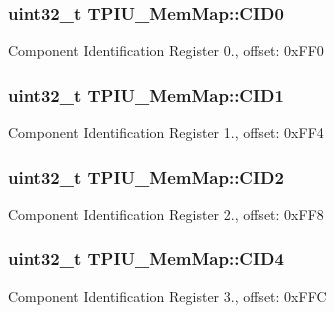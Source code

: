 \subsubsection[{C\+I\+D0}]{\setlength{\rightskip}{0pt plus 5cm}uint32\+\_\+t T\+P\+I\+U\+\_\+\+Mem\+Map\+::\+C\+I\+D0}\label{struct_t_p_i_u___mem_map_a396bb8a0f5c7a9494f0cd0973e8a141d}
Component Identification Register 0., offset\+: 0x\+F\+F0 \hypertarget{struct_t_p_i_u___mem_map_afa92c6c4b400339e646d717e30b505b7}{}
\subsubsection[{C\+I\+D1}]{\setlength{\rightskip}{0pt plus 5cm}uint32\+\_\+t T\+P\+I\+U\+\_\+\+Mem\+Map\+::\+C\+I\+D1}\label{struct_t_p_i_u___mem_map_afa92c6c4b400339e646d717e30b505b7}
Component Identification Register 1., offset\+: 0x\+F\+F4 \hypertarget{struct_t_p_i_u___mem_map_a3b613f265bf4b8c679e4da5f002eb4cd}{}
\subsubsection[{C\+I\+D2}]{\setlength{\rightskip}{0pt plus 5cm}uint32\+\_\+t T\+P\+I\+U\+\_\+\+Mem\+Map\+::\+C\+I\+D2}\label{struct_t_p_i_u___mem_map_a3b613f265bf4b8c679e4da5f002eb4cd}
Component Identification Register 2., offset\+: 0x\+F\+F8 \hypertarget{struct_t_p_i_u___mem_map_ae113185bb92abeaaa996a345b28d33a8}{}
\subsubsection[{C\+I\+D4}]{\setlength{\rightskip}{0pt plus 5cm}uint32\+\_\+t T\+P\+I\+U\+\_\+\+Mem\+Map\+::\+C\+I\+D4}\label{struct_t_p_i_u___mem_map_ae113185bb92abeaaa996a345b28d33a8}
Component Identification Register 3., offset\+: 0x\+F\+F\+C \hypertarget{struct_t_p_i_u___mem_map_a01f1e255c3a45165fab0992c2db91029}{}
